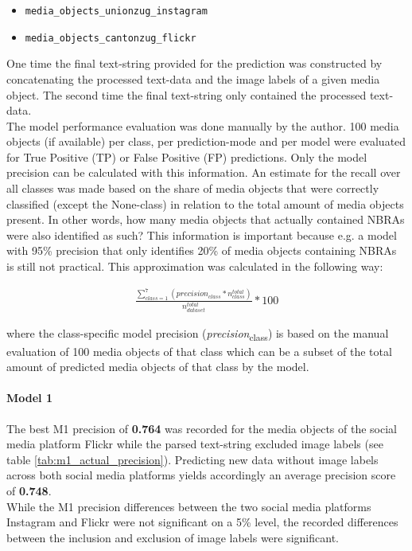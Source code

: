 \begin{itemize}
    \item \texttt{media\_objects\_unionzug\_instagram} \item \texttt{media\_objects\_cantonzug\_flickr}
\end{itemize}

One time the final text-string provided for the prediction was constructed by concatenating the processed text-data and the image labels of a given media object. The second time the final text-string only contained the processed text-data.\\

The model performance evaluation was done manually by the author. 100 media objects (if available) per class, per prediction-mode and per model were evaluated for True Positive (TP) or False Positive (FP) predictions. Only the model precision can be calculated with this information. An estimate for the recall over all classes was made based on the share of media objects that were correctly classified (except the None-class) in relation to the total amount of media objects present. In other words, how many media objects that actually contained NBRAs were also identified as such? This information is important because e.g. a model with 95\% precision that only identifies 20\% of media objects containing NBRAs is still not practical. This approximation was calculated in the following way:

\begin{ceqn}
\begin{align}
\label{equation_share_TP}
\frac{\sum_{class=1}^{7}(precision_{class}  * n^{total}_{class})}{n^{total}_{dataset}} * 100
\end{align}
\end{ceqn}

where the class-specific model precision (\textit{precision}\textsubscript{class}) is based on the manual evaluation of 100 media objects of that class which can be a subset of the total amount of predicted media objects of that class by the model.

\paragraph*{Model 1}
The best M1 precision of \textbf{0.764} was recorded for the media objects of the social media platform Flickr while the parsed text-string excluded image labels (see table \ref{tab:m1_actual_precision}). Predicting new data without image labels across both social media platforms yields accordingly an average precision score of \textbf{0.748}.\\
While the M1 precision differences between the two social media platforms Instagram and Flickr were not significant on a 5\% level, the recorded differences between the inclusion and exclusion of image labels were significant.

